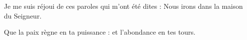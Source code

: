 \Rbardot{} Je me suis réjoui de ces paroles qui m’ont été dites : Nous irons dans la maison du Seigneur.

\Vbardot{} Que la paix règne en ta puissance : et l’abondance en tes tours.
